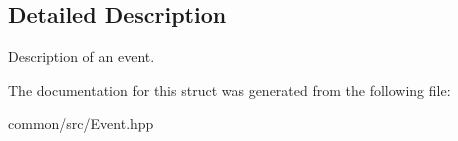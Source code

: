 \subsection{Detailed Description}
Description of an event. 

The documentation for this struct was generated from the following file\+:\begin{DoxyCompactItemize}
\item 
common/src/Event.\+hpp\end{DoxyCompactItemize}
